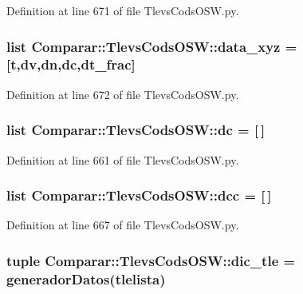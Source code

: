 \-Definition at line 671 of file \-Tlevs\-Cods\-O\-S\-W.\-py.

\subsubsection[{data\-\_\-xyz}]{\setlength{\rightskip}{0pt plus 5cm}list {\bf \-Comparar\-::\-Tlevs\-Cods\-O\-S\-W\-::data\-\_\-xyz} = [{\bf t},{\bf dv},{\bf dn},{\bf dc},{\bf dt\-\_\-frac}]}\label{namespace_comparar_1_1_tlevs_cods_o_s_w_a841e85546174cadb738eead62b51ae0c}


\-Definition at line 672 of file \-Tlevs\-Cods\-O\-S\-W.\-py.

\subsubsection[{dc}]{\setlength{\rightskip}{0pt plus 5cm}list {\bf \-Comparar\-::\-Tlevs\-Cods\-O\-S\-W\-::dc} = [$\,$]}\label{namespace_comparar_1_1_tlevs_cods_o_s_w_a26a82f2f3640b3d6352b6e1f48f28b2a}


\-Definition at line 661 of file \-Tlevs\-Cods\-O\-S\-W.\-py.

\subsubsection[{dcc}]{\setlength{\rightskip}{0pt plus 5cm}list {\bf \-Comparar\-::\-Tlevs\-Cods\-O\-S\-W\-::dcc} = [$\,$]}\label{namespace_comparar_1_1_tlevs_cods_o_s_w_afa289d4d809218bc536e6e4442952180}


\-Definition at line 667 of file \-Tlevs\-Cods\-O\-S\-W.\-py.

\subsubsection[{dic\-\_\-tle}]{\setlength{\rightskip}{0pt plus 5cm}tuple {\bf \-Comparar\-::\-Tlevs\-Cods\-O\-S\-W\-::dic\-\_\-tle} = generador\-Datos({\bf tlelista})}\label{namespace_comparar_1_1_tlevs_cods_o_s_w_a15e6e9937287f3d218fee795c481de64}


